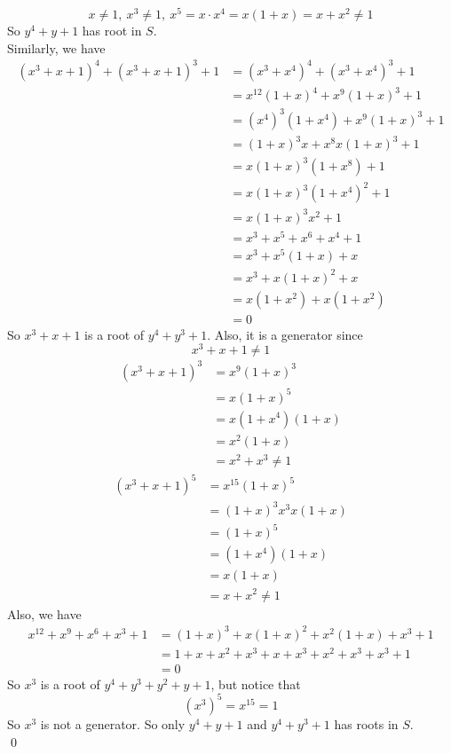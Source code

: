 \documentclass[12pt]{amsart}
\begin{document}
\[x\neq 1,\ x^3\neq 1,\ x^5=x\cdot x^4=x(1+x)=x+x^2\neq 1\]
So $y^4+y+1$ has root in $S$.\\
Similarly, we have 
\begin{align*}
    (x^3+x+1)^4+(x^3+x+1)^3+1&=(x^3+x^4)^4+  (x^3+x^4)^3+1\\
    &=x^{12}(1+x)^4+x^9(1+x)^3+1\\
    &=(x^4)^3(1+x^4)+x^9(1+x)^3+1\\
    &=(1+x)^3x+x^8x(1+x)^3+1\\
    &=x(1+x)^3(1+x^8)+1\\
    &=x(1+x)^3(1+x^4)^2+1\\
    &=x(1+x)^3x^2+1\\
    &=x^3+x^5+x^6+x^4+1\\
    &=x^3+x^5(1+x)+x\\
    &=x^3+x(1+x)^2+x\\
    &=x(1+x^2)+x(1+x^2)\\
    &=0
\end{align*}
So $x^3+x+1$ is a root of $y^4+y^3+1$. Also, it is a generator since 
\[x^3+x+1\neq 1\]
\begin{align*}
    (x^3+x+1)^3&=x^9(1+x)^3\\
    &=x(1+x)^5\\
    &=x(1+x^4)(1+x)\\
    &=x^2(1+x)\\
    &=x^2+x^3\neq 1
\end{align*} 
\begin{align*}
    (x^3+x+1)^5&=x^15(1+x)^5\\
    &=(1+x)^3x^3x(1+x)\\
    &=(1+x)^5\\
    &=(1+x^4)(1+x)\\
    &=x(1+x)\\
    &=x+x^2\neq 1
\end{align*} 
Also, we have 
\begin{align*}
    x^12+x^9+x^6+x^3+1&=(1+x)^3+x(1+x)^2+x^2(1+x)+x^3+1\\
    &=1+x+x^2+x^3+x+x^3+x^2+x^3+x^3+1\\
    &=0
\end{align*}
So $x^3$ is a root of $y^4+y^3+y^2+y+1$, but notice that 
\[(x^3)^5=x^{15}=1\]
So $x^3$ is not a generator.
So only $y^4+y+1$ and $y^4+y^3+1$ has roots in $S$.\\\qed\\
\end{document}
